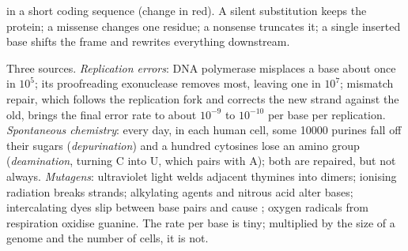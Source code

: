 \begin{omfigure}

{\small {} in a short coding sequence (change in red).
A silent substitution keeps the protein; a missense changes one
residue; a nonsense truncates it; a single inserted base shifts the
frame and rewrites everything downstream.}
\end{omfigure}

\begin{proposition}\label{prop:b2:genome-diversification:sources}
Three sources. \emph{Replication errors}: DNA polymerase misplaces a
base about once in $10^{5}$; its proofreading exonuclease removes
most, leaving one in $10^{7}$; mismatch repair, which follows the
replication fork and corrects the new strand against the old, brings
the final error rate to about $10^{-9}$ to $10^{-10}$ per base per
replication. \emph{Spontaneous chemistry}: every day, in each human
cell, some \num{10000} purines fall off their sugars
(\emph{depurination}) and a hundred cytosines lose an amino group
(\emph{deamination}, turning C into U, which pairs with A); both are
repaired, but not always. \emph{Mutagens}: ultraviolet light welds
adjacent thymines into dimers; ionising radiation breaks strands;
alkylating agents and nitrous acid alter bases; intercalating dyes
slip between base pairs and cause ; oxygen radicals from
respiration oxidise guanine. The rate per base is tiny; multiplied
by the size of a genome and the number of cells, it is not.
\end{proposition}

